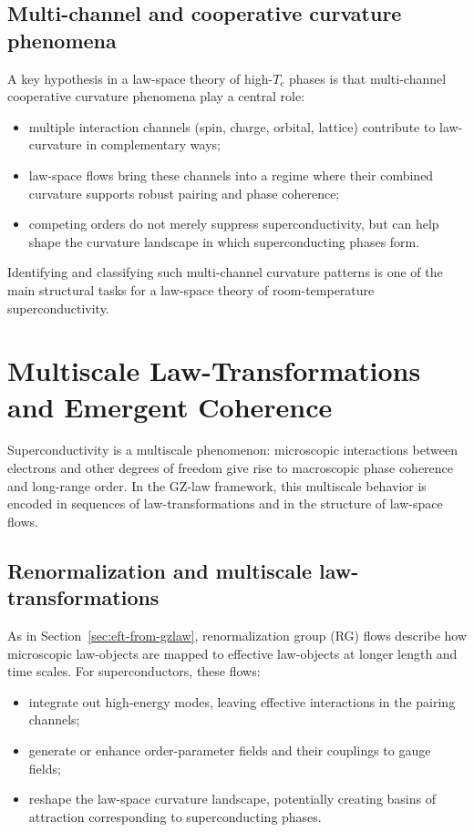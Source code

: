 \documentclass[11pt]{book}
\theoremstyle{plain}
\theoremstyle{definition}
\theoremstyle{remark}
\begin{document}
\subsection*{Multi-channel and cooperative curvature phenomena}

A key hypothesis in a law-space theory of high-$T_c$ phases is that
multi-channel cooperative curvature phenomena play a central role:
\begin{itemize}
  \item multiple interaction channels (spin, charge, orbital,
        lattice) contribute to law-curvature in complementary ways;
  \item law-space flows bring these channels into a regime where
        their combined curvature supports robust pairing and phase
        coherence;
  \item competing orders do not merely suppress superconductivity,
        but can help shape the curvature landscape in which
        superconducting phases form.
\end{itemize}

Identifying and classifying such multi-channel curvature patterns
is one of the main structural tasks for a law-space theory of
room-temperature superconductivity.

\section{Multiscale Law-Transformations and Emergent Coherence}
\label{sec:multiscale-lawtransform-coherence}


Superconductivity is a multiscale phenomenon: microscopic
interactions between electrons and other degrees of freedom give
rise to macroscopic phase coherence and long-range order. In the
GZ-law framework, this multiscale behavior is encoded in sequences
of law-transformations and in the structure of law-space flows.

\subsection*{Renormalization and multiscale law-transformations}

As in Section~\ref{sec:eft-from-gzlaw}, renormalization group (RG)
flows describe how microscopic law-objects are mapped to effective
law-objects at longer length and time scales. For superconductors,
these flows:

\begin{itemize}
  \item integrate out high-energy modes, leaving effective
        interactions in the pairing channels;
  \item generate or enhance order-parameter fields and their
        couplings to gauge fields;
  \item reshape the law-space curvature landscape, potentially
        creating basins of attraction corresponding to superconducting
        phases.
\end{itemize}
\end{document}
